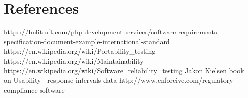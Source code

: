 \documentclass[12pt]{article}
\begin{document}
\section{References}
https://belitsoft.com/php-development-services/software-requirements-specification-document-example-international-standard\\
https://en.wikipedia.org/wiki/Portability_testing\\
https://en.wikipedia.org/wiki/Maintainability\\
https://en.wikipedia.org/wiki/Software_reliability_testing
Jakon Nielsen book on Usability - response intervals data 
http://www.enforcive.com/regulatory-compliance-software
\end{document}

